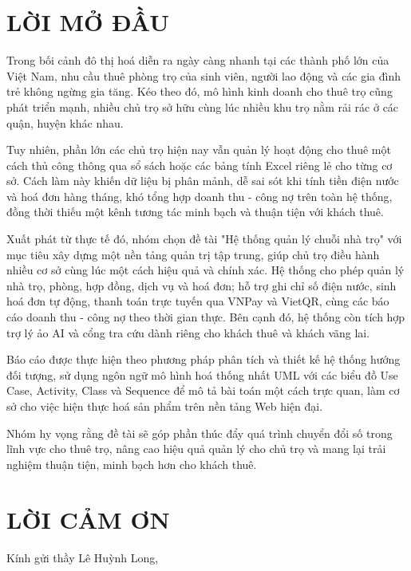 \documentclass[a4paper,oneside]{report}
\newcommand{\chuongkhongso}[1]{%
  \chapter*{#1}%
  \addcontentsline{toc}{chapter}{#1}}
\begin{document}
\chuongkhongso{LỜI MỞ ĐẦU}

Trong bối cảnh đô thị hoá diễn ra ngày càng nhanh tại các thành phố lớn
của Việt Nam, nhu cầu thuê phòng trọ của sinh viên, người lao động và
các gia đình trẻ không ngừng gia tăng. Kéo theo đó, mô hình kinh doanh
cho thuê trọ cũng phát triển mạnh, nhiều chủ trọ sở hữu cùng lúc nhiều
khu trọ nằm rải rác ở các quận, huyện khác nhau.

Tuy nhiên, phần lớn các chủ trọ hiện nay vẫn quản lý hoạt động cho thuê
một cách thủ công thông qua sổ sách hoặc các bảng tính Excel riêng lẻ
cho từng cơ sở. Cách làm này khiến dữ liệu bị phân mảnh, dễ sai sót khi
tính tiền điện nước và hoá đơn hàng tháng, khó tổng hợp doanh thu - công
nợ trên toàn hệ thống, đồng thời thiếu một kênh tương tác minh bạch và
thuận tiện với khách thuê.

Xuất phát từ thực tế đó, nhóm chọn đề tài "Hệ thống quản lý chuỗi nhà
trọ" với mục tiêu xây dựng một nền tảng quản trị tập trung, giúp chủ trọ
điều hành nhiều cơ sở cùng lúc một cách hiệu quả và chính xác. Hệ thống
cho phép quản lý nhà trọ, phòng, hợp đồng, dịch vụ và hoá đơn; hỗ trợ
ghi chỉ số điện nước, sinh hoá đơn tự động, thanh toán trực tuyến qua
VNPay và VietQR, cùng các báo cáo doanh thu - công nợ theo thời gian
thực. Bên cạnh đó, hệ thống còn tích hợp trợ lý ảo AI và cổng tra cứu
dành riêng cho khách thuê và khách vãng lai.

Báo cáo được thực hiện theo phương pháp phân tích và thiết kế hệ thống
hướng đối tượng, sử dụng ngôn ngữ mô hình hoá thống nhất UML với các
biểu đồ Use Case, Activity, Class và Sequence để mô tả bài toán một cách
trực quan, làm cơ sở cho việc hiện thực hoá sản phẩm trên nền tảng Web
hiện đại.

Nhóm hy vọng rằng đề tài sẽ góp phần thúc đẩy quá trình chuyển đổi số
trong lĩnh vực cho thuê trọ, nâng cao hiệu quả quản lý cho chủ trọ và
mang lại trải nghiệm thuận tiện, minh bạch hơn cho khách thuê.

\chuongkhongso{LỜI CẢM ƠN}

Kính gửi thầy Lê Huỳnh Long,
\end{document}
